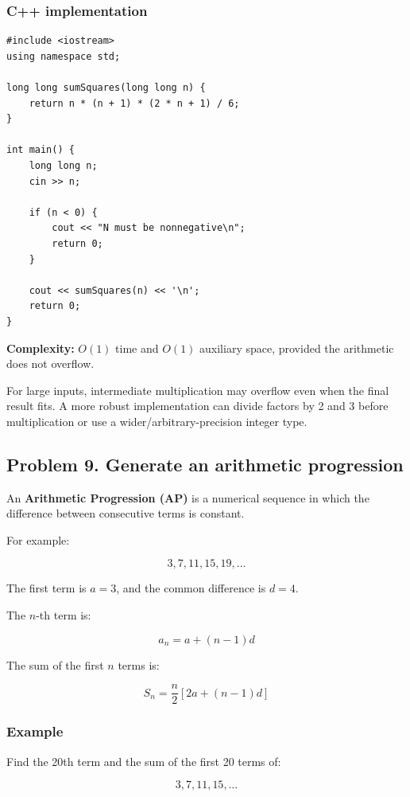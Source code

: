 \subsubsection{C++ implementation}

\begin{lstlisting}[style=cppstyle]
#include <iostream>
using namespace std;

long long sumSquares(long long n) {
    return n * (n + 1) * (2 * n + 1) / 6;
}

int main() {
    long long n;
    cin >> n;

    if (n < 0) {
        cout << "N must be nonnegative\n";
        return 0;
    }

    cout << sumSquares(n) << '\n';
    return 0;
}
\end{lstlisting}

\textbf{Complexity:} $O(1)$ time and $O(1)$ auxiliary space, provided the arithmetic does not overflow.

For large inputs, intermediate multiplication may overflow even when the final result fits. A more robust implementation can divide factors by 2 and 3 before multiplication or use a wider/arbitrary-precision integer type.

\subsection{Problem 9. Generate an arithmetic progression}

An \textbf{Arithmetic Progression (AP)} is a numerical sequence in which the difference between consecutive terms is constant.

For example:


\[
3,7,11,15,19,\ldots
\]


The first term is $a=3$, and the common difference is $d=4$.

The $n$-th term is:


\[
\boxed{a_n=a+(n-1)d}
\]


The sum of the first $n$ terms is:


\[
\boxed{S_n=\frac n2\left[2a+(n-1)d\right]}
\]


\subsubsection{Example}

Find the 20th term and the sum of the first 20 terms of:


\[
3,7,11,15,\ldots
\]


